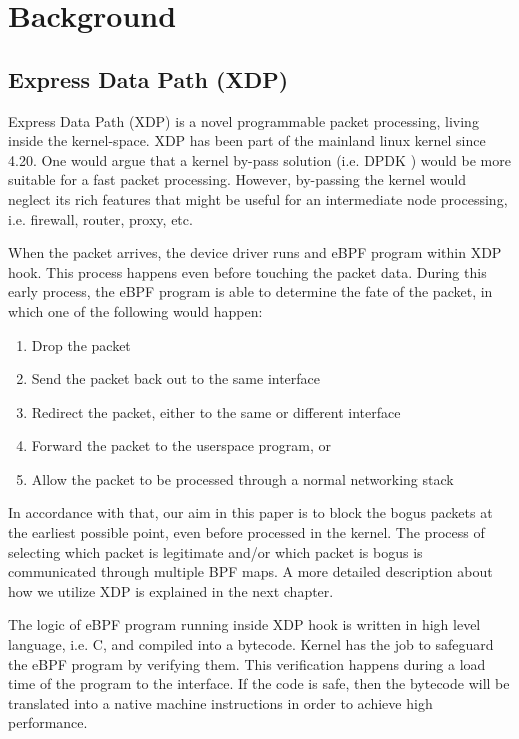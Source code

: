 \documentclass[sigplan,screen]{acmart}
\begin{document}
\section{Background}
\subsection{Express Data Path (XDP)}
Express Data Path (XDP) \cite{10.1145/3281411.3281443} is a novel programmable packet processing, living inside the kernel-space. XDP has been part of the mainland linux kernel since 4.20. One would argue that a kernel by-pass solution (i.e. DPDK \cite{dpdk}) would be more suitable for a fast packet processing. However, by-passing the kernel would neglect its rich features that might be useful for an intermediate node processing, i.e. firewall, router, proxy, etc. 


When the packet arrives, the device driver runs and eBPF program within XDP hook. This process happens even before touching the packet data. During this early process, the eBPF program is able to determine the fate of the packet, in which one of the following would happen:
\begin{enumerate}
\item Drop the packet
\item Send the packet back out to the same interface
\item Redirect the packet, either to the same or different interface
\item Forward the packet to the userspace program, or
\item Allow the packet to be processed through a normal networking stack
\end{enumerate}
In accordance with that, our aim in this paper is to block the bogus packets at the earliest possible point, even before processed in the kernel. The process of selecting which packet is legitimate and/or which packet is bogus is communicated through multiple BPF maps. A more detailed description about how we utilize XDP is explained in the next chapter. 

The logic of eBPF program running inside XDP hook is written in high level language, i.e. C, and compiled into a bytecode. Kernel has the job to safeguard the eBPF program by verifying them. This verification happens during a load time of the program to the interface. If the code is safe, then the bytecode will be translated into a native machine instructions in order to achieve high performance.
\end{document}

